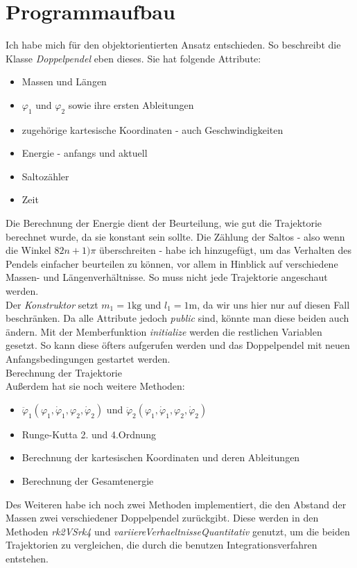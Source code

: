 \documentclass[12pt,a4paper,titlepage,headinclude,bibtotoc]{scrartcl}
\begin{document}
\section{Programmaufbau}
Ich habe mich für den objektorientierten Ansatz entschieden.
So beschreibt die Klasse \textit{Doppelpendel} eben dieses. 
Sie hat folgende Attribute:
\begin{itemize}
	\item Massen und Längen	
	\item $\varphi_1$ und $\varphi_2$ sowie ihre ersten Ableitungen
	\item zugehörige kartesische Koordinaten - auch Geschwindigkeiten
	\item Energie - anfangs und aktuell
	\item Saltozähler
	\item Zeit
\end{itemize}
Die Berechnung der Energie dient der Beurteilung, wie gut die Trajektorie berechnet wurde, da sie konstant sein sollte.
Die Zählung der Saltos - also wenn die Winkel $82n+1)\pi$ überschreiten - habe ich hinzugefügt, um das Verhalten des Pendels einfacher beurteilen zu können, vor allem in Hinblick auf verschiedene Massen- und Längenverhältnisse.
So muss nicht jede Trajektorie angeschaut werden.\\
Der \textit{Konstruktor} setzt $m_1=1\si{\kilo\gram}$ und $l_1=1\si{\meter}$, da wir uns hier nur auf diesen Fall beschränken.
Da alle Attribute jedoch \textit{public} sind, könnte man diese beiden auch ändern.
Mit der Memberfunktion \textit{initialize} werden die restlichen Variablen gesetzt.
So kann diese öfters aufgerufen werden und das Doppelpendel mit neuen Anfangsbedingungen gestartet werden.\\
Berechnung der Trajektorie\\
Außerdem hat sie noch weitere Methoden:
\begin{itemize}
	\item $\ddot{\varphi}_1\left(\varphi_1, \dot{\varphi}_1,\varphi_2, \dot{\varphi}_2\right)$ und $\ddot{\varphi}_2\left(\varphi_1, \dot{\varphi}_1,\varphi_2, \dot{\varphi}_2\right)$
	\item Runge-Kutta 2. und 4.Ordnung	
	\item Berechnung der kartesischen Koordinaten und deren Ableitungen
	\item Berechnung der Gesamtenergie
\end{itemize}

Des Weiteren habe ich noch zwei Methoden implementiert, die den Abstand der Massen zwei verschiedener Doppelpendel zurückgibt.
Diese werden in den Methoden \textit{rk2VSrk4} und \textit{variiereVerhaeltnisseQuantitativ} genutzt, um die beiden Trajektorien zu vergleichen, die durch die benutzen Integrationsverfahren entstehen.
\end{document}
